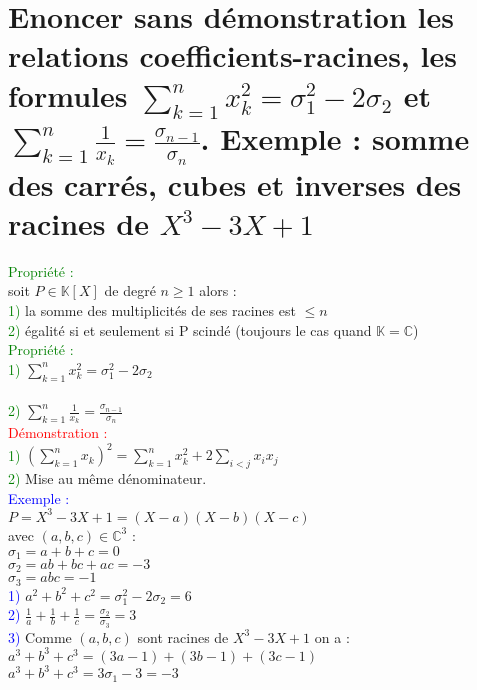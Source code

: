 \documentclass{article}
\begin{document}
\section{Enoncer sans démonstration les relations coefficients-racines, les formules $\sum_{k=1}^n x_k^2= \sigma_1^2-2 \sigma_2$ et $\sum_{k=1}^n \frac{1}{x_k}=\frac{\sigma_{n-1}}{\sigma_{n}}$. Exemple : somme des carrés, cubes et inverses des racines de $X^3-3X+1$}
\textcolor{green}{Propriété :} \\
soit $P \in \mathbb K [X]$ de degré $n \geq 1$ alors : \\
\textcolor{green}{1)} la somme des multiplicités de ses racines est $\leq n$ \\
\textcolor{green}{2)} égalité si et seulement si P scindé (toujours le cas quand $\mathbb K = \mathbb C$) \\
\textcolor{green}{Propriété :} \\
\textcolor{green}{1)} $\sum_{k=1}^n x_k^2= \sigma_1^2-2 \sigma_2$ \\ \\
\textcolor{green}{2)} $\sum_{k=1}^n \frac{1}{x_k}=\frac{\sigma_{n-1}}{\sigma_{n}}$ \\
\textcolor{red}{Démonstration :} \\
\textcolor{green}{1)} $(\sum_{k=1}^n x_k)^2= \sum_{k=1}^n x_k^2+ 2 \sum_{i<j}x_ix_j$ \\
\textcolor{green}{2)} Mise au même dénominateur. \\
\textcolor{blue}{Exemple :} \\
$P=X^3-3X+1=(X-a)(X-b)(X-c)$ \\
avec $(a,b,c) \in \mathbb C^3$ : \\
$\sigma_1=a+b+c=0$ \\
$\sigma_2=ab+bc+ac=-3$ \\
$\sigma_3=abc=-1$ \\
\textcolor{blue}{1)} $a^2+b^2+c^2= \sigma_1^2-2\sigma_2=6$ \\
\textcolor{blue}{2)} $\frac{1}{a}+ \frac{1}{b} + \frac{1}{c}= \frac{\sigma_2}{\sigma_3}=3$ \\
\textcolor{blue}{3)} Comme $(a,b,c)$ sont racines de $X^3-3X+1$ on a : \\
$a^3+b^3+c^3=(3a-1)+(3b-1)+(3c-1)$ \\
$a^3+b^3+c^3=3 \sigma_1 -3 =-3$
\end{document}
